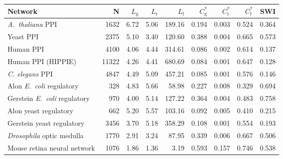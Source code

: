 \begin{tabular}{lrrrrrrrr}
\hline
Network & N  & $L_{\mathrm{g}}$ & $L_{\mathrm{r}}$ & $L_{\mathrm{l}}$ & $C^\ast_{\mathrm{g}}$ & $C^\ast_{\mathrm{r}}$ & $C^\ast_{\mathrm{l}}$ &  SWI \\
\hline
\textit{A.~thaliana} PPI & 1632 & 6.72 & 5.06 & 189.16 & 0.194 & 0.003 & 0.524 & 0.364\\
Yeast PPI & 2375 & 5.10 & 3.40 & 120.60 & 0.388 & 0.004 & 0.665 & 0.573\\
Human PPI & 4100 & 4.06 & 4.44 & 314.61 & 0.086 & 0.002 & 0.614 & 0.137\\
Human PPI (HIPPIE) & 11322 & 4.26 & 4.41 & 680.69 & 0.084 & 0.001 & 0.647 & 0.128\\
\textit{C. elegans} PPI & 4847 & 4.49 & 5.09 & 457.21 & 0.085 & 0.001 & 0.576 & 0.146\\
Alon \textit{E.~coli} regulatory & 328 & 4.83 & 5.66 & 58.98 & 0.227 & 0.008 & 0.329 & 0.694\\
Gerstein \textit{E.~coli} regulatory & 970 & 4.00 & 5.14 & 127.22 & 0.364 & 0.004 & 0.483 & 0.758\\
Alon yeast regulatory & 662 & 5.20 & 5.57 & 103.16 & 0.092 & 0.005 & 0.410 & 0.215\\
Gerstein yeast regulatory & 3456 & 3.70 & 5.18 & 358.29 & 0.108 & 0.001 & 0.554 & 0.193\\
\textit{Drosophila} optic medulla & 1770 & 2.91 & 3.24 & 87.95 & 0.339 & 0.006 & 0.667 & 0.506\\
Mouse retina neural network & 1076 & 1.86 & 1.36 & 3.19 & 0.593 & 0.157 & 0.746 & 0.538\\
\hline
\end{tabular}
